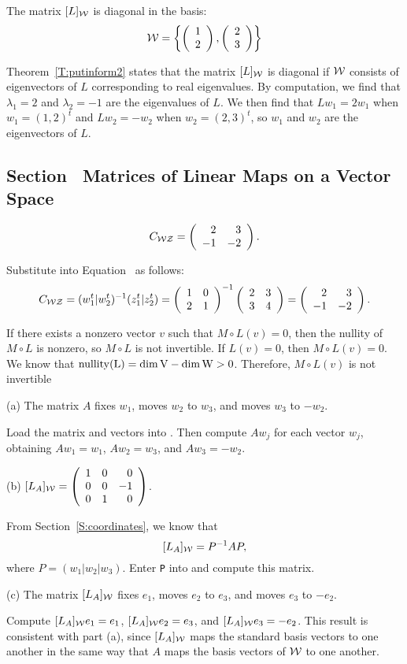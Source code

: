 \documentclass{ximera}
\begin{document}
\ans The matrix $[L]_{\cal W}$ is diagonal in the basis:
\[
{\cal W} = \left\{\left(\begin{array}{r} 1 \\ 2\end{array}\right),\left(\begin{array}{r} 2 \\ 3\end{array}\right)\right\}
\]

\soln Theorem~\ref{T:putinform2} states
that the matrix $[L]_{\cal W}$ is diagonal if ${\cal W}$ consists of
eigenvectors of $L$ corresponding to real eigenvalues.  By
computation, we find that $\lambda_1 = 2$ and $\lambda_2 = -1$ are
the eigenvalues of $L$.  We then find that $Lw_1 = 2w_1$ when
$w_1 = (1,2)^t$ and $Lw_2 = -w_2$ when $w_2 = (2,3)^t$, so $w_1$ and
$w_2$ are the eigenvectors of $L$.



\newpage
\subsection*{Section~\protect{\ref{MALT}} Matrices of Linear Maps on a
Vector Space}

\ans
\[ C_{\cal WZ} = \left(\begin{array}{rr} 2 & 3\\ -1 &-2\end{array}\right). \]

\soln Substitute into Equation~ as follows:
\[ C_{\cal WZ} = (w_1^t|w_2^t)^{-1}(z_1^t|z_2^t) =
\left(\begin{array}{rr} 1 & 0\\ 2 &1\end{array}\right)^{-1}\left(\begin{array}{rr} 2 & 3\\ 3 &4\end{array}\right) =
\left(\begin{array}{rr} 2 & 3\\ -1 &-2\end{array}\right). \]

If there exists a nonzero vector $v$ such that $M\circ L(v) = 0$,
then the nullity of $M \circ L$ is nonzero, so $M \circ L$ is not
invertible.  If $L(v) = 0$, then $M \circ L(v) = 0$.  We know that
$\rm{nullity}(L) = \dim V - \dim W > 0$.  Therefore, $M\circ L(v)$
is not invertible

(a) \ans The matrix $A$ fixes $w_1$, moves $w_2$ to $w_3$, and moves
$w_3$ to $-w_2$.

\soln Load the matrix and vectors into \Matlabp.  Then compute $Aw_j$ for
each vector $w_j$, obtaining $Aw_1 = w_1$, $Aw_2 = w_3$, and $Aw_3 = -w_2$.

(b) \ans $[L_A]_{\cal W} = \left(\begin{array}{rrr} 1 & 0 & 0 \\ 0 & 0 & -1 \\ 0 & 1 & 0\end{array}\right)$.

\soln From Section~\ref{S:coordinates}, we know that
\[
[L_A]_{\cal W} = P^{-1}AP,
\]
where $P = (w_1|w_2|w_3)$.  Enter {\tt P} into \Matlab and compute this
matrix.

(c) \ans The matrix $[L_A]_{\cal W}$ fixes $e_1$, moves $e_2$ to
$e_3$, and moves $e_3$ to $-e_2$.

\soln Compute $[L_A]_{\cal W}e_1 = e_1$, $[L_A]_{\cal W}e_2 = e_3$, and
$[L_A]_{\cal W}e_3 = -e_2$.  This result is consistent with part (a),
since $[L_A]_{\cal W}$ maps the standard basis vectors to one another
in the same way that $A$ maps the basis vectors of ${\cal W}$ to one
another.
\end{document}
